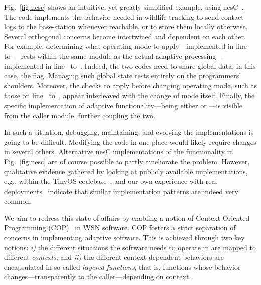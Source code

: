 
Fig.~\ref{fig:nesc} shows an intuitive, yet greatly simplified
example, using nesC~\cite{gay03nesc}. The code implements the behavior needed
in wildlife tracking to send contact logs to the base-station whenever
reachable, or to store them locally otherwise. Several orthogonal
concerns become intertwined and dependent on each other. For example,
determining what operating mode to apply---implemented in
line~ to~---rests within the same
module as the actual adaptive processing---implemented in
line~ to~. Indeed, the two codes need to
share global data, in this case, the 
flag. Managing such global state rests entirely on the programmers'
shoulders. Moreover, the checks to apply before changing operating
mode, such as those on line~ to~, appear
interleaved with the change of mode itself. Finally, the specific
implementation of adaptive functionality---being either
 or ---is visible from the caller
module, further coupling the two.

In such a situation, debugging, maintaining, and evolving the
implementations is going to be difficult. Modifying the code in one
place would likely require changes in several others. Alternative nesC
implementations of the functionality in Fig.~\ref{fig:nesc} are of
course possible to partly ameliorate the problem. However, qualitative
evidence gathered by looking at publicly available implementations,
e.g., within the TinyOS codebase~\cite{tinyos}, and our own experience
with real deployments~\cite{ceriotti11:light,ceriotti09:monitoring}
indicate that similar implementation patterns are indeed very common.


 We aim to redress this state of
affairs by enabling a notion of Context-Oriented Programming
(COP)~\cite{Hirschfeld08} in WSN software. COP fosters a strict
separation of concerns in implementing adaptive software. This is
achieved through two key notions: \emph{i)} the different situations
the software needs to operate in are mapped to different
\emph{contexts}, and \emph{ii)} the different context-dependent
behaviors are encapsulated in so called \emph{layered functions}, that
is, functions whose behavior changes---transparently to the
caller---depending on context.

